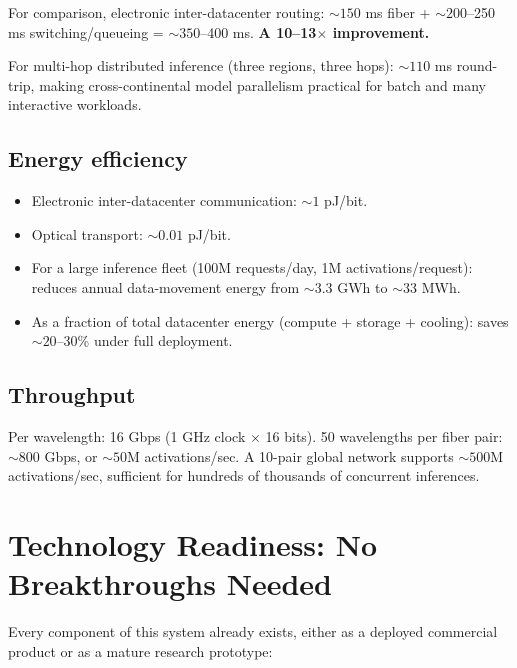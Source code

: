 \documentclass[12pt]{article}
\begin{document}
\noindent For comparison, electronic inter-datacenter routing: \(\sim\!150\) ms fiber +
\(\sim\!200\)--250 ms switching/queueing = \(\sim\!350\)--400 ms. \textbf{A 10--13$\times$
improvement.}

For multi-hop distributed inference (three regions, three hops): \(\sim\!110\) ms
round-trip, making cross-continental model parallelism practical for batch and
many interactive workloads.

\subsection{Energy efficiency}

\begin{itemize}[leftmargin=1.6em,itemsep=2pt]
  \item Electronic inter-datacenter communication: \(\sim\!1\) pJ/bit.
  \item Optical transport: \(\sim\!0.01\) pJ/bit.
  \item For a large inference fleet (100M requests/day, 1M activations/request):
  reduces annual data-movement energy from \(\sim\!3.3\) GWh to \(\sim\!33\) MWh.
  \item As a fraction of total datacenter energy (compute + storage + cooling):
  saves \(\sim\!20\)--30\% under full deployment.
\end{itemize}

\subsection{Throughput}

Per wavelength: 16 Gbps (1 GHz clock $\times$ 16 bits). 50 wavelengths per fiber
pair: \(\sim\!800\) Gbps, or \(\sim\!50\)M activations/sec. A 10-pair global network
supports \(\sim\!500\)M activations/sec, sufficient for hundreds of thousands of
concurrent inferences.

\section{Technology Readiness: No Breakthroughs Needed}
\label{sec:trl}

Every component of this system already exists, either as a deployed commercial
product or as a mature research prototype:
\end{document}

